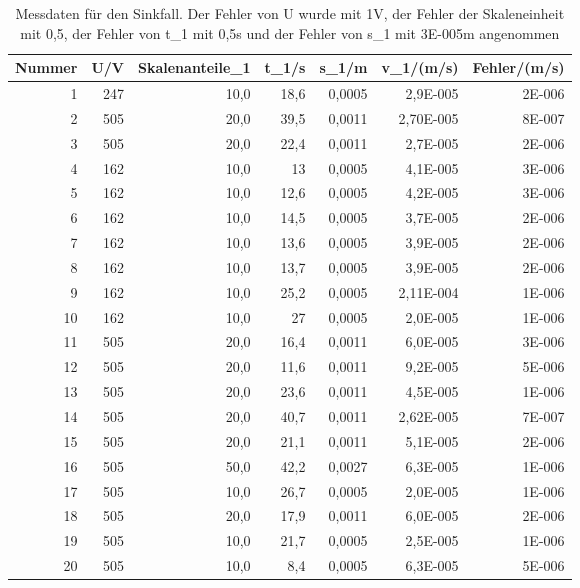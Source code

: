 \documentclass[12pt]{scrartcl}
\begin{document}
\begin{table}[H]
\caption{Messdaten für den Sinkfall. Der Fehler von U wurde mit 1V, der Fehler der Skaleneinheit mit 0,5, der Fehler von t\_1 mit 0,5s und der Fehler von s\_1 mit 3E-005m angenommen}
\begin{center}
\begin{tabular}{|r|r|r|r|r|r|r|}
\hline
\multicolumn{1}{|l|}{Nummer} & \multicolumn{1}{|l|}{U/V} & \multicolumn{1}{l|}{Skalenanteile\_1} & \multicolumn{1}{l|}{t\_1/s} & \multicolumn{1}{l|}{s\_1/m} & \multicolumn{1}{l|}{v\_1/(m/s)} & \multicolumn{1}{l|}{Fehler/(m/s)} \\ \hline
1 & 247 & 10,0 & 18,6 & 0,0005 & 2,9E-005 & 2E-006 \\ \hline
2 & 505 & 20,0 & 39,5 & 0,0011  & 2,70E-005 & 8E-007 \\ \hline
3 & 505 & 20,0 & 22,4 & 0,0011 & 2,7E-005  & 2E-006 \\ \hline
4 & 162 & 10,0 & 13 & 0,0005  & 4,1E-005 & 3E-006 \\ \hline
5 & 162 & 10,0 & 12,6 & 0,0005  & 4,2E-005 & 3E-006 \\ \hline
6 & 162 & 10,0 & 14,5 & 0,0005  & 3,7E-005 & 2E-006 \\ \hline
7 & 162 & 10,0 & 13,6 & 0,0005  & 3,9E-005 & 2E-006 \\ \hline
8 & 162 & 10,0 & 13,7 & 0,0005  & 3,9E-005 & 2E-006 \\ \hline
9 & 162 & 10,0 & 25,2 & 0,0005  & 2,11E-004 & 1E-006 \\ \hline
10 & 162 & 10,0 & 27 & 0,0005  & 2,0E-005 & 1E-006 \\ \hline
11 & 505 & 20,0 & 16,4 & 0,0011  & 6,0E-005 & 3E-006 \\ \hline
12 & 505 & 20,0 & 11,6 & 0,0011  & 9,2E-005 & 5E-006 \\ \hline
13 & 505 & 20,0 & 23,6 & 0,0011  & 4,5E-005 & 1E-006 \\ \hline
14 & 505 & 20,0 & 40,7 & 0,0011  & 2,62E-005 & 7E-007 \\ \hline
15 & 505 & 20,0 & 21,1 & 0,0011  & 5,1E-005 & 2E-006 \\ \hline
16 & 505 & 50,0 & 42,2 & 0,0027  & 6,3E-005 & 1E-006 \\ \hline
17 & 505 & 10,0 & 26,7 & 0,0005  & 2,0E-005 & 1E-006 \\ \hline
18 & 505 & 20,0 & 17,9 & 0,0011  & 6,0E-005 & 2E-006 \\ \hline
19 & 505 & 10,0 & 21,7 & 0,0005  & 2,5E-005 & 1E-006 \\ \hline
20 & 505 & 10,0 & 8,4 & 0,0005  & 6,3E-005 & 5E-006 \\ \hline

\end{tabular}
\end{center}
\end{table}
\end{document}
